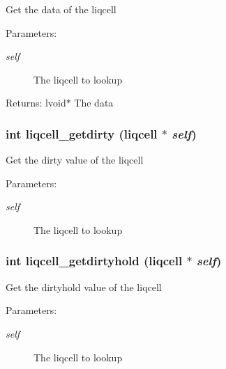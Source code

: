 Get the data of the liqcell \begin{Desc}
\item[Parameters:]
\begin{description}
\item[{\em self}]The liqcell to lookup \end{description}
\end{Desc}
\begin{Desc}
\item[Returns:]lvoid$\ast$ The data \end{Desc}
\subsubsection[{liqcell\_\-getdirty}]{\setlength{\rightskip}{0pt plus 5cm}int liqcell\_\-getdirty (liqcell $\ast$ {\em self})}\label{d5/da2/liqcell_8c_4ad7b1f1e7825a4978c66a829b6a375f}


Get the dirty value of the liqcell \begin{Desc}
\item[Parameters:]
\begin{description}
\item[{\em self}]The liqcell to lookup \end{description}
\end{Desc}
\subsubsection[{liqcell\_\-getdirtyhold}]{\setlength{\rightskip}{0pt plus 5cm}int liqcell\_\-getdirtyhold (liqcell $\ast$ {\em self})}\label{d5/da2/liqcell_8c_3c8c2fecfc41ff548544dbd3513a9f6c}


Get the dirtyhold value of the liqcell \begin{Desc}
\item[Parameters:]
\begin{description}
\item[{\em self}]The liqcell to lookup \end{description}
\end{Desc}
